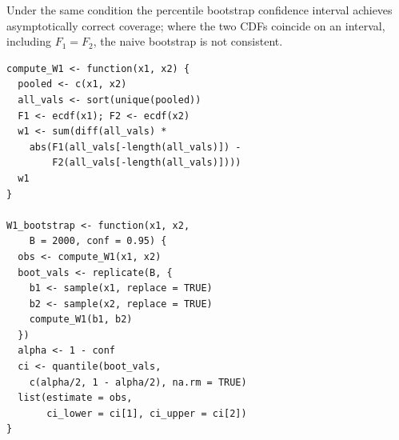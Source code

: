 \documentclass[AMA,Times1COL]{WileyNJDv5}
\begin{document}
Under the same condition the percentile bootstrap confidence interval achieves asymptotically correct coverage; where the two CDFs coincide on an interval, including $F_1 = F_2$, the naive bootstrap is not consistent.\cite{sommerfeld2018}


\begin{lstlisting}[caption={R function for computing the Wasserstein-1 distance with bootstrap confidence intervals.},label=lst:nabcd,basicstyle=\fontsize{8}{10}\selectfont\ttfamily]
compute_W1 <- function(x1, x2) {
  pooled <- c(x1, x2)
  all_vals <- sort(unique(pooled))
  F1 <- ecdf(x1); F2 <- ecdf(x2)
  w1 <- sum(diff(all_vals) *
    abs(F1(all_vals[-length(all_vals)]) -
        F2(all_vals[-length(all_vals)])))
  w1
}

W1_bootstrap <- function(x1, x2,
    B = 2000, conf = 0.95) {
  obs <- compute_W1(x1, x2)
  boot_vals <- replicate(B, {
    b1 <- sample(x1, replace = TRUE)
    b2 <- sample(x2, replace = TRUE)
    compute_W1(b1, b2)
  })
  alpha <- 1 - conf
  ci <- quantile(boot_vals,
    c(alpha/2, 1 - alpha/2), na.rm = TRUE)
  list(estimate = obs,
       ci_lower = ci[1], ci_upper = ci[2])
}
\end{lstlisting}
\end{document}
